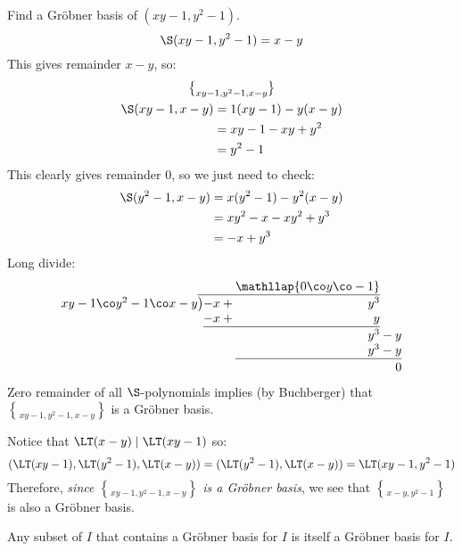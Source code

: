 \eg Find a Gr\"obner basis of $(xy-1,y^2-1)$.
\[ \S(xy-1,y^2-1)=x-y \]
This gives remainder $x-y$, so:
\begin{gather*}
\brace{xy-1,y^2-1,x-y} \\
\begin{aligned}
\S(xy-1,x-y) &= 1(xy-1)-y(x-y) \\
&= xy-1-xy+y^2 \\
&= y^2-1
\end{aligned}
\end{gather*}
This clearly gives remainder $0$, so we just need to check:
\begin{align*}
\S(y^2-1,x-y) &= x(y^2-1)-y^2(x-y) \\
&= xy^2 - x - xy^2 + y^3 \\
&= -x + y^3
\end{align*}
Long divide:
\[
\begin{array}{@{}r@{}r@{}r@{}r@{}r@{}r@{}r@{}}
& & & & \mathllap{0\co y\co-1} \\
\cline{2-5}
xy-1\co y^2-1\co x-y\rule{0pt}{1em}& \bigl) & -x & {}+{} & y^3 \\
& & -x & {}+{} & y & \\
\cline{3-5}
\rule{0pt}{1em}& & & & y^3 & {}-{} & y \\
& & & & y^3 &{}-{}& y \\
\cline{5-7}
\rule{0pt}{1em}& & & & & & 0
\end{array}
\]
Zero remainder of all $\S$-polynomials implies (by Buchberger) that $\brace{xy-1,y^2-1,x-y}$ is a Gr\"obner basis.

Notice that $\LT(x-y)\mid\LT(xy-1)$ so:
\[ (\LT(xy-1),\LT(y^2-1),\LT(x-y)) = (\LT(y^2-1),\LT(x-y)) = \LT(xy-1,y^2-1) \]
Therefore, \emph{since $\brace{xy-1,y^2-1,x-y}$\/ is a Gr\"obner basis}, we see that $\brace{x-y,y^2-1}$ is also a Gr\"obner basis.

Any subset of $I$ that contains a Gr\"obner basis for $I$ is itself a Gr\"obner basis for $I$.


